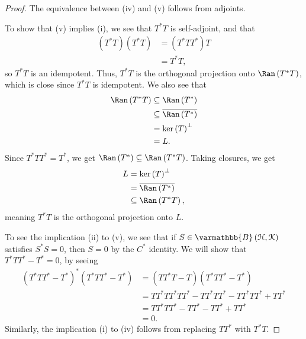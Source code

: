 \documentclass[10pt]{mypackage}
\renewcommand*{\mathbb}[1]{\varmathbb{#1}}
\newcommand{\B}{\mathbb{B}}
\begin{document}
\begin{proof}
  The equivalence between (iv) and (v) follows from adjoints.\newline

  To show that (v) implies (i), we see that $T^{\ast}T$ is self-adjoint, and that
  \begin{align*}
    \left(T^{\ast}T\right)\left(T^{\ast}T\right) &= \left(T^{\ast}TT^{\ast}\right)T\\
                                                 &= T^{\ast}T,
  \end{align*}
  so $T^{\ast}T$ is an idempotent. Thus, $T^{\ast}T$ is the orthogonal projection onto $\Ran\left(T^{\ast}T\right)$, which is close since $T^{\ast}T$ is idempotent. We also see that
  \begin{align*}
    \Ran\left(T^{\ast}T\right)&\subseteq \Ran\left(T^{\ast}\right)\\
                              &\subseteq \overline{\Ran\left(T^{\ast}\right)}\\
                              &= \ker\left(T\right)^{\perp}\\
                              &= L.
  \end{align*}
  Since $T^{\ast}TT^{\ast} = T^{\ast}$, we get $\Ran\left(T^{\ast}\right)\subseteq \Ran\left(T^{\ast}T\right)$. Taking closures, we get
  \begin{align*}
    L &= \ker\left(T\right)^{\perp}\\
      &= \overline{\Ran\left(T^{\ast}\right)}\\
      &\subseteq \Ran\left(T^{\ast}T\right),
  \end{align*}
  meaning $T^{\ast}T$ is the orthogonal projection onto $L$.\newline

  To see the implication (ii) to (v), we see that if $S\in \B\left(\mathcal{H},\mathcal{K}\right)$ satisfies $S^{\ast}S = 0$, then $S = 0$ by the $C^{\ast}$ identity. We will show that $T^{\ast}TT^{\ast} - T^{\ast} = 0$, by seeing
  \begin{align*}
    \left(T^{\ast}TT^{\ast} - T^{\ast}\right)^{\ast}\left(T^{\ast}TT^{\ast} - T^{\ast}\right) &= \left(TT^{\ast}T - T\right)\left(T^{\ast}TT^{\ast} - T^{\ast}\right)\\
                                                                                              &= TT^{\ast}TT^{\ast}TT^{\ast} - TT^{\ast}TT^{\ast} - TT^{\ast}TT^{\ast} + TT^{\ast}\\
                                                                                              &= TT^{\ast}TT^{\ast} - TT^{\ast} - TT^{\ast} + TT^{\ast}\\
                                                                                              &= 0.
  \end{align*}
  Similarly, the implication (i) to (iv) follows from replacing $TT^{\ast}$ with $T^{\ast}T$.\newline


\end{proof}
\end{document}
